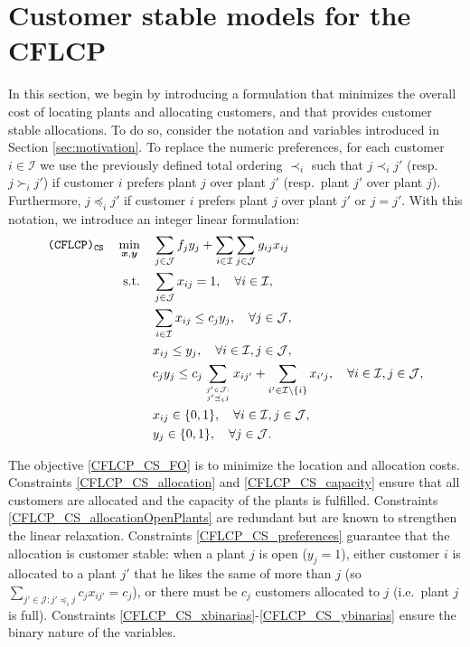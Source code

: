 \documentclass[preprint,11pt,authoryear]{elsarticle}
\def\J{\mathcal{J}}
\def\I{\mathcal{I}}
\begin{document}
\section{Customer stable models for the CFLCP} \label{sec:customerstablemodels}
In this section, we begin by introducing a formulation that minimizes the overall cost of locating plants and allocating customers, and that provides customer stable allocations. To do so, consider the notation and variables introduced in Section \ref{sec:motivation}. To replace the numeric preferences, for each customer $i\in \I$ we use the previously defined total ordering $\prec_i$ such that $j\prec_i j'$ (resp.\ $j \succ_i j'$) if customer $i$ prefers plant $j$ over plant $j'$ (resp.\ plant $j'$ over plant $j$). Furthermore, $j\preceq_i j'$ if customer $i$ prefers plant $j$ over plant $j'$ or $j=j'$. With this notation, we introduce an integer linear formulation:
\begin{subequations} \label{CFLCP_CS}
\begin{align}
\texttt{(CFLCP)}_{\texttt{CS}} \quad \min_{\boldsymbol{x},\boldsymbol{y}} \quad & \sum_{j\in \J} f_jy_j + \sum_{i\in \I} \sum_{j\in \J} g_{ij}x_{ij}  \label{CFLCP_CS_FO} \\
\text{s.t.} \quad &\sum_{j\in \J} x_{ij} = 1, \quad \forall i\in \I, \label{CFLCP_CS_allocation}\\
& \sum_{i\in \I} x_{ij}  \le c_jy_j, \quad \forall j\in\J, \label{CFLCP_CS_capacity}\\
&x_{ij} \le y_j, \quad \forall i \in \I, j \in \J, \label{CFLCP_CS_allocationOpenPlants} \\
&  c_jy_j \leq c_j\sum_{j'\in \J:\atop j'\preceq_i j} x_{ij'} + \sum_{i'\in \I\setminus \{i\}} x_{i'j}, \quad \forall i\in \I, j\in \J, \label{CFLCP_CS_preferences} \\
& x_{ij} \in \{0,1\}, \quad \forall i \in \I, j \in \J,  \label{CFLCP_CS_xbinarias} \\
& y_j \in \{0,1\}, \quad \forall j \in \J.  \label{CFLCP_CS_ybinarias}
\end{align}
\end{subequations}

The objective \eqref{CFLCP_CS_FO} is to minimize the location and allocation costs. Constraints \eqref{CFLCP_CS_allocation} and \eqref{CFLCP_CS_capacity} ensure that all customers are allocated and the capacity of the plants is fulfilled. Constraints \eqref{CFLCP_CS_allocationOpenPlants} are redundant but are known to strengthen the linear relaxation. Constraints \eqref{CFLCP_CS_preferences} guarantee that the allocation is customer stable: when a plant $j$ is open ($y_j=1$), either customer $i$ is allocated to a plant $j'$ that he likes the same of more than $j$ (so $\sum_{j'\in \J: j'\preceq_i j} c_jx_{ij'} = c_{j}$), or there must be $c_j$ customers allocated to $j$ (i.e.\ plant $j$ is full). Constraints \eqref{CFLCP_CS_xbinarias}-\eqref{CFLCP_CS_ybinarias} ensure the binary nature of the variables.
\end{document}
